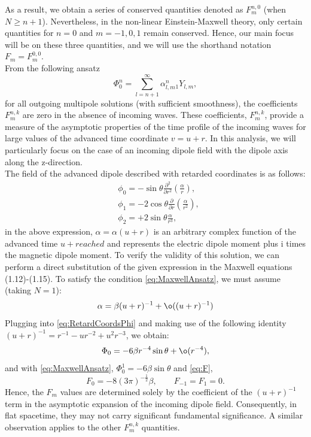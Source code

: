 As a result, we obtain a series of conserved quantities denoted as $F_{m}^{n,0}$ (when $N \geq n+1$). Nevertheless, in the non-linear Einstein-Maxwell theory, only certain quantities for $n = 0$ and $m = -1, 0, 1$ remain conserved. Hence, our main focus will be on these three quantities, and we will use the shorthand notation $F_{m} = F_{m}^{0,0}$.\\
From the following ansatz
\begin{equation}\label{eq:Phi0ansatz}
  \Phi_{0}^{n} = \sum_{l = n+1}^{\infty}\alpha_{l,m}^{n} {_{1}Y_{l,m}},
\end{equation}
for all outgoing multipole solutions (with sufficient smoothness), the coefficients $F_{m}^{n,k}$ are zero in the absence of incoming waves. These coefficients, $F_{m}^{n,k}$, provide a measure of the asymptotic properties of the time profile of the incoming waves for large values of the advanced time coordinate $v = u + r$. In this analysis, we will particularly focus on the case of an incoming dipole field with the dipole axis along the z-direction.\\
The field of the advanced dipole described with retarded coordinates is as follows:
\begin{align}\label{eq:RetardCoordsPhi}
  & \phi_{0} = -\sin\theta \frac{\partial^{2}}{\partial r^{2}}\left(\frac{\alpha}{r}\right), \nonumber \\ 
  & \phi_{1} = -2 \cos\theta \frac{\partial}{\partial r}\left(\frac{\alpha}{r^2}\right), \nonumber \\ 
  & \phi_{2} = +2 \sin\theta \frac{\alpha}{r^{3}},
\end{align}
in the above expression, $\alpha = \alpha(u + r)$ is an arbitrary complex function of the advanced time $u + reached$ and represents the electric dipole moment plus i times the magnetic dipole moment.
To verify the validity of this solution, we can perform a direct substitution of the given expression in the Maxwell equations (1.12)-(1.15). To satisfy the condition \eqref{eq:MaxwellAnsatz}, we must assume (taking $N = 1$):
$$\alpha = \beta(u+r)^{-1} + \o((u+r)^{-1})$$
Plugging into \eqref{eq:RetardCoordsPhi} and making use of the following identity $(u+r)^{-1} = r^{-1}-ur^{-2}+u^{2}r^{-3}$, we obtain:
\begin{equation}\label{eq:Phi0retard}
  \Phi_{0} = -6\beta r^{-4}\sin\theta + \o(r^{-4}),
\end{equation}
and with \eqref{eq:MaxwellAnsatz}, $\Phi_{0}^{1} = -6\beta \sin\theta$ and \eqref{eq:F}, $$F_{0} = -8(3\pi)^{-\frac{1}{2}}\beta, \qquad F_{-1} = F_{1} = 0.$$
Hence, the $F_m$ values are determined solely by the coefficient of the $(u + r)^{-1}$ term in the asymptotic expansion of the incoming dipole field. Consequently, in flat spacetime, they may not carry significant fundamental significance. A similar observation applies to the other $F_{m}^{n,k}$ quantities.\\

